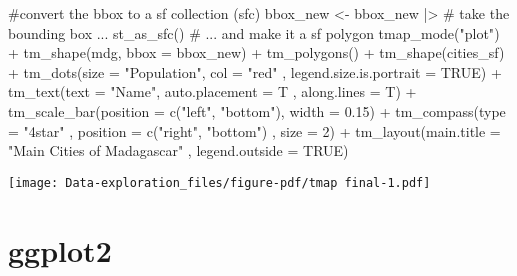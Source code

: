 \documentclass[
  letterpaper,
  DIV=11,
  numbers=noendperiod]{scrreprt}
\newenvironment{Shaded}{\begin{snugshade}}{\end{snugshade}}
\newcommand{\AttributeTok}[1]{\textcolor[rgb]{0.40,0.45,0.13}{#1}}
\newcommand{\CommentTok}[1]{\textcolor[rgb]{0.37,0.37,0.37}{#1}}
\newcommand{\ConstantTok}[1]{\textcolor[rgb]{0.56,0.35,0.01}{#1}}
\newcommand{\DecValTok}[1]{\textcolor[rgb]{0.68,0.00,0.00}{#1}}
\newcommand{\FloatTok}[1]{\textcolor[rgb]{0.68,0.00,0.00}{#1}}
\newcommand{\FunctionTok}[1]{\textcolor[rgb]{0.28,0.35,0.67}{#1}}
\newcommand{\NormalTok}[1]{\textcolor[rgb]{0.00,0.23,0.31}{#1}}
\newcommand{\OtherTok}[1]{\textcolor[rgb]{0.00,0.23,0.31}{#1}}
\newcommand{\SpecialCharTok}[1]{\textcolor[rgb]{0.37,0.37,0.37}{#1}}
\newcommand{\StringTok}[1]{\textcolor[rgb]{0.13,0.47,0.30}{#1}}
\begin{document}
\begin{Shaded}
\begin{Highlighting}[]
\CommentTok{\#convert the bbox to a sf collection (sfc)}
\NormalTok{bbox\_new }\OtherTok{\textless{}{-}}\NormalTok{ bbox\_new }\SpecialCharTok{|\textgreater{}}  \CommentTok{\# take the bounding box ...}
  \FunctionTok{st\_as\_sfc}\NormalTok{() }\CommentTok{\# ... and make it a sf polygon}
\FunctionTok{tmap\_mode}\NormalTok{(}\StringTok{"plot"}\NormalTok{) }\SpecialCharTok{+}
  \FunctionTok{tm\_shape}\NormalTok{(mdg, }\AttributeTok{bbox =}\NormalTok{ bbox\_new) }\SpecialCharTok{+}
  \FunctionTok{tm\_polygons}\NormalTok{() }\SpecialCharTok{+}
  \FunctionTok{tm\_shape}\NormalTok{(cities\_sf) }\SpecialCharTok{+}
  \FunctionTok{tm\_dots}\NormalTok{(}\AttributeTok{size =} \StringTok{"Population"}\NormalTok{, }\AttributeTok{col =} \StringTok{"red"}
\NormalTok{          , }\AttributeTok{legend.size.is.portrait =} \ConstantTok{TRUE}\NormalTok{) }\SpecialCharTok{+}
  \FunctionTok{tm\_text}\NormalTok{(}\AttributeTok{text =} \StringTok{"Name"}\NormalTok{, }\AttributeTok{auto.placement =}\NormalTok{ T}
\NormalTok{          , }\AttributeTok{along.lines =}\NormalTok{ T) }\SpecialCharTok{+}
  \FunctionTok{tm\_scale\_bar}\NormalTok{(}\AttributeTok{position =} \FunctionTok{c}\NormalTok{(}\StringTok{"left"}\NormalTok{, }\StringTok{"bottom"}\NormalTok{), }\AttributeTok{width =} \FloatTok{0.15}\NormalTok{) }\SpecialCharTok{+}
  \FunctionTok{tm\_compass}\NormalTok{(}\AttributeTok{type =} \StringTok{"4star"}
\NormalTok{             , }\AttributeTok{position =} \FunctionTok{c}\NormalTok{(}\StringTok{"right"}\NormalTok{, }\StringTok{"bottom"}\NormalTok{)}
\NormalTok{             , }\AttributeTok{size =} \DecValTok{2}\NormalTok{) }\SpecialCharTok{+}
  \FunctionTok{tm\_layout}\NormalTok{(}\AttributeTok{main.title =} \StringTok{"Main Cities of Madagascar"}\NormalTok{                         , }\AttributeTok{legend.outside =} \ConstantTok{TRUE}\NormalTok{)}
\end{Highlighting}
\end{Shaded}

\texttt{[image: Data-exploration\_files/figure-pdf/tmap final-1.pdf]}

\section{ggplot2}
\end{document}
